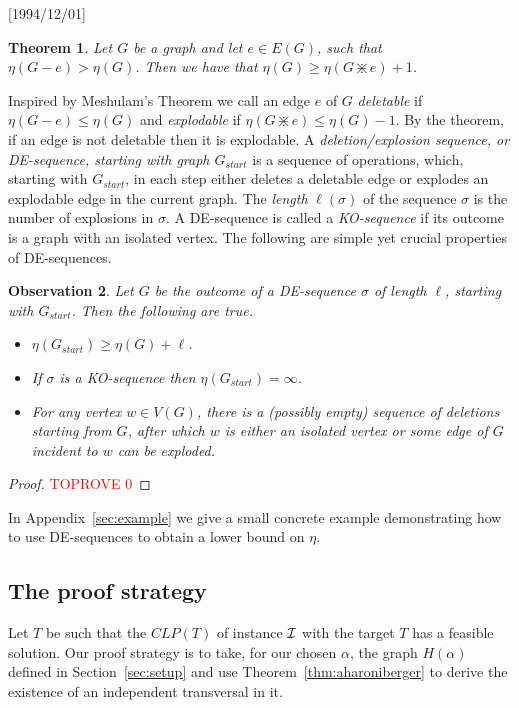 \NeedsTeXFormat{LaTeX2e}[1994/12/01]\documentclass[letterpaper, 11pt]{article}
\newtheorem{thm}{Theorem}[section]
\newtheorem{obs}[thm]{Observation}
\theoremstyle{definition}
\theoremstyle{remark}
\numberwithin{equation}{section}
\newcommand{\explode}{\divideontimes}
\begin{document}
\begin{thm} \label{thm:meshulam}
Let $G$ be a graph and let $e \in E(G)$, such that $\eta(G-e) >
\eta(G)$. Then we have that $\eta(G) \geq \eta(G \explode e) + 1$.
\end{thm}

Inspired by Meshulam's Theorem we call an edge $e$ of $G$ {\em
  deletable} if $\eta(G-e) \leq \eta (G)$ and {\em explodable} if
$\eta(G\explode e) \leq \eta (G)-1$. By the theorem, if an edge is not
deletable then it is explodable.
A {\em deletion/explosion sequence, or DE-sequence,
  starting with graph $G_{start}$} is a sequence of
operations, which, starting with $G_{start}$, in each step either deletes a
deletable edge or explodes an explodable edge in the current graph.
The {\em length} $\ell (\sigma)$ of the sequence $\sigma$ is the
number of explosions in $\sigma$.  
A DE-sequence is called a {\em KO-sequence} if its outcome is a graph with an isolated vertex.
The  following are simple yet crucial properties of DE-sequences.   

\begin{obs}\label{obs:sequence}
  Let $G$ be the outcome of a DE-sequence $\sigma$ of length
  $\ell$, starting with $G_{start}$. Then the following are true.
  \begin{itemize}
 \item[(i)] $\eta (G_{start}) \geq \eta (G) + \ell$.
\item[(ii)] If $\sigma$ is a KO-sequence  then $\eta  (G_{start}) =\infty$. 
\item[(iii)] 
For any vertex $w\in V(G)$, there is a (possibly empty) sequence of deletions starting from $G$, after which $w$ is either an isolated vertex or  some edge of $G$ incident to $w$ can be exploded. 
  
  \end{itemize}
     \end{obs}
     \begin{proof}\textcolor{red}{TOPROVE 0}\end{proof}
 In Appendix~\ref{sec:example} we give a small concrete example
demonstrating how to use DE-sequences to obtain a lower bound on $\eta$.

\subsection{The proof strategy}\label{sec:strategy}
Let $T$ be such that the $CLP(T)$ of instance ${\cal I}$  with the target $T$
has a feasible solution.
Our proof strategy is to take, for our chosen $\alpha$,
the graph $H(\alpha)$ defined in Section~\ref{sec:setup}
and use Theorem~\ref{thm:aharoniberger} to derive
the existence of an independent transversal in it.
\end{document}
